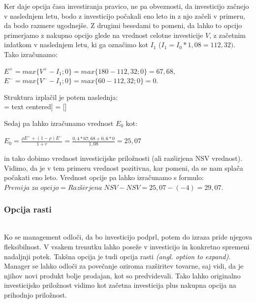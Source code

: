 Ker daje opcija časa investiranja pravico, ne pa obveznosti, da investicijo začnejo v naslednjem letu, bodo z investicijo počakali eno leto in z njo začeli v primeru, da bodo razmere ugodnejše. Z drugimi besedami to pomeni, da lahko to opcijo primerjamo z nakupno opcijo glede na vrednost celotne investicije $V$, z začetnim izdatkom v naslednjem letu, ki ga označimo kot $I_1$ ($I_1 = I_0*1,08 = 112,32)$.  Tako izračunamo:
 \begin{center}
$E^+ = max\{V^+ - I_1; 0\} = max\{180 - 112,32; 0\} = 67,68$,\\[0,5 cm]
$E^- = max\{V^- - I_1; 0\} = max\{60 - 112,32; 0\} = 0.$
\end{center}
Struktura izplačil je potem naslednja: \\

 =  text centered]
 = []


Sedaj pa lahko izračunamo vrednost $E_0$ kot: 
 \begin{center}
$E_0 = \tfrac{\rho E^+ + (1-\rho)E^-}{1+r} = \tfrac{0,4 * 67,68 + 0,6 * 0}{1,08} = 25,07 $
\end{center}
in tako dobimo vrednost investicijske priložnosti (ali razširjena NSV vrednost). Vidimo, da je v tem primeru vrednost pozitivna, kar pomeni, da se nam splača počakati eno leto. Vrednost opcije pa lahko izračunamo s formulo:\\[0,5 cm]
$Premija\;za\; opcijo = Razširjena\; NSV - NSV = 25,07 - (-4) = 29,07. $\\

\subsubsection{Opcija rasti}
\cite[str. 162, 163]{Trigeorgis}\\
Ko se management odloči, da bo investicijo podprl, potem do izraza pride njegova fleksibilnost. V vsakem trenutku lahko poseže v investicijo in konkretno spremeni nadaljnji potek. Takšna opcija je tudi opcija rasti \textit{(angl. option to expand)}. Manager se lahko odloči za povečanje oziroma razširitev tovarne, saj vidi, da je njihov novi produkt bolje prodajan, kot so predvidevali. Tako lahko originalno investicijsko priložnost vidimo kot začetna investicija plus nakupna opcija na prihodnjo priložnost.\\

